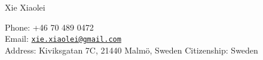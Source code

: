 \documentclass[10pt,letterpaper]{article}
\def\name{Xie Xiaolei}
\begin{document}
{\huge \name}


\vspace{0.25in}

\begin{minipage}[t]{0.5\textwidth}
  Phone: +46 70 489 0472 \\
  Email: \href{mailto:xie.xiaolei@gmail.com}{\tt xie.xiaolei@gmail.com} \\
  Address: Kiviksgatan 7C, 21440 Malm\"{o}, Sweden
  Citizenship: Sweden \\
\end{minipage}

\end{document}

